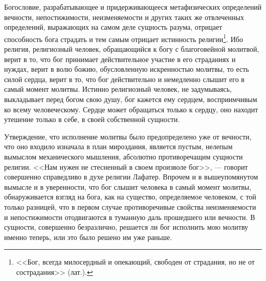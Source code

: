 \documentclass[12pt,oneside]{book}
\begin{document}
Богословие, разрабатывающее и придерживающееся метафизических определений вечности, непостижимости, неизменяемости и других таких же отвлеченных определений, выражающих на самом деле сущность разума, отрицает способность бога страдать и тем самым отрицает истинность религии\dag\let\svthefootnote\thefootnote\let\thefootnote\relax{}\let\thefootnote\svthefootnote\footnote{<<Бог, всегда милосердный и опекающий, свободен от страдания, но не от сострадания>> (лат.).}. Ибо религия, религиозный человек, обращающийся к богу с благоговейной молитвой, верит в то, что бог принимает действительное участие в его страданиях и нуждах, верит в волю божию, обусловленную искренностью молитвы, то есть силой сердца, верит в то, что бог действительно и немедленно слышит его в самый момент молитвы. Истинно религиозный человек, не задумываясь, выкладывает перед богом свою душу, бог кажется ему сердцем, восприимчивым ко всему человеческому. Сердце может обращаться только к сердцу, оно находит утешение только в себе, в своей собственной сущности.



Утверждение, что исполнение молитвы было предопределено уже от вечности, что оно входило изначала в план мироздания, является пустым, нелепым вымыслом механического мышления, абсолютно противоречащим сущности религии. <<Нам нужен не стесненный в своем произволе бог>>, --- говорит совершенно справедливо в духе религии Лафатер. Впрочем и в вышеупомянутом вымысле и в уверенности, что бог слышит человека в самый момент молитвы, обнаруживается взгляд на бога, как на существо, определяемое человеком, с той только разницей, что в первом случае противоречивые свойства неизменяемости и непостижимости отодвигаются в туманную даль прошедшего или вечности. В сущности, совершенно безразлично, решается ли бог исполнить мою молитву именно теперь, или это было решено им уже раньше.
\end{document}
